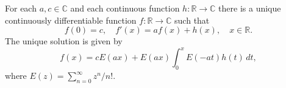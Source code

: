 For each $a, c \in \mathbb{C}$ and each continuous function $h: \mathbb{R} \to \mathbb{C}$ there is a unique continuously differentiable function $f: \mathbb{R} \to \mathbb{C}$ such that
$$f(0) = c, \quad f'(x) = af(x) + h(x), \quad x \in \mathbb{R}.$$
The unique solution is given by
$$f(x) = cE(ax) + E(ax)\int_0^x E(-at)h(t)\,dt,$$
where $E(z) = \sum_{n=0}^{\infty} z^n/n!$.
